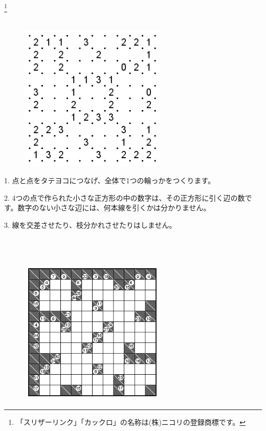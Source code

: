 \footnote{「スリザーリンク」「カックロ」の名称は(株)ニコリの登録商標です。}
\leavevmode \\
\\
\begin{figure}[H]
\centering
\includegraphics[width =7cm,bb = 0 0 202 202]{sp1slitherlink1.png}
\end{figure}
\begin{description}
\item{1.} 点と点をタテヨコにつなげ、全体で1つの輪っかをつくります。
\item{2.}  4つの点で作られた小さな正方形の中の数字は、その正方形に引く辺の数です。数字のない小さな辺には、何本線を引くかは分かりません。
\item{3.} 線を交差させたり、枝分かれさせたりはしません。
\end{description}
\newpage
{}
\leavevmode \\
\\

\begin{figure}[H]
\centering 
\includegraphics[width = 7cm,bb = 0 0 240 240]{sp1kakkuro1.png}
\end{figure}

